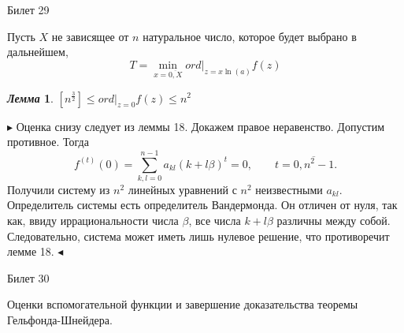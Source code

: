 \documentclass[a4paper,12pt]{article}
\newtheorem{lem}{\textit{Лемма}}
\newcommand{\q}{\quad}
\newcommand{\pb}{\blacktriangleright}
\newcommand{\pe}{\blacktriangleleft}
\newcommand{\SL}{\sum\limits}
\begin{document}
\newpage
\begin{mybox}{{Билет 29}}

Пусть $X$ не зависящее от $n$ натуральное число, которое будет выбрано в дальнейшем,
\begin{equation}
T = \min\limits_{x=\overline{0,X}} ord|_{z=x \ln (a)} f(z)\label{eq::10}
\end{equation}

\begin{formbox}{}
\begin{lem} $[n^\frac{3}{2}] \le ord|_{z=0}f(z) \le n^2$
\end{lem}
\end{formbox}
$\pb$ Оценка снизу следует из леммы 18. Докажем правое неравенство.
Допустим противное. Тогда \[f^{(t)}(0) = \SL_{k,l=0}^{n-1}a_{kl}(k + l\beta)^t = 0, \q\q t = \overline{0, n^2 - 1}.\]
Получили систему из $n^2$ линейных уравнений с $n^2$ неизвестными \(a_{kl}\). Определитель системы есть определитель Вандермонда. Он отличен от нуля, так как, ввиду иррациональности числа $\beta$, все числа $k+l\beta$ различны между собой. Следовательно, система может иметь лишь нулевое решение, что противоречит лемме 18. $\pe$

\end{mybox}
\newpage
\begin{mybox2}{\hypertarget{bil30}{Билет 30}}

\begin{formbox}{}
Оценки вспомогательной функции и завершение доказательства теоремы Гельфонда-Шнейдера.
\end{formbox}

\end{mybox2}
\end{document}
